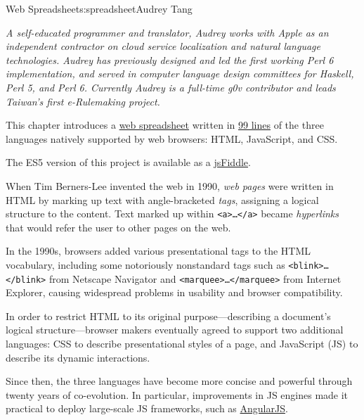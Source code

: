 \begin{aosachapter}{Web Spreadsheet}{s:spreadsheet}{Audrey Tang}

\emph{A self-educated programmer and translator, Audrey works with Apple
as an independent contractor on cloud service localization and natural
language technologies. Audrey has previously designed and led the first
working Perl 6 implementation, and served in computer language design
committees for Haskell, Perl 5, and Perl 6. Currently Audrey is a
full-time g0v contributor and leads Taiwan's first e-Rulemaking
project.}

This chapter introduces a
\href{http://audreyt.github.io/500lines/spreadsheet/}{web spreadsheet}
written in
\href{https://github.com/audreyt/500lines/tree/master/spreadsheet/code}{99
lines} of the three languages natively supported by web browsers: HTML,
JavaScript, and CSS.

The ES5 version of this project is available as a
\href{http://jsfiddle.net/audreyt/LtDyP/}{jsFiddle}.

\label{introduction}

When Tim Berners-Lee invented the web in 1990, \emph{web pages} were
written in HTML by marking up text with angle-bracketed \emph{tags},
assigning a logical structure to the content. Text marked up within
\texttt{\textless{}a\textgreater{}\ldots{}\textless{}/a\textgreater{}}
became \emph{hyperlinks} that would refer the user to other pages on the
web.

In the 1990s, browsers added various presentational tags to the HTML
vocabulary, including some notoriously nonstandard tags such as
\texttt{\textless{}blink\textgreater{}\ldots{}\textless{}/blink\textgreater{}}
from Netscape Navigator and
\texttt{\textless{}marquee\textgreater{}\ldots{}\textless{}/marquee\textgreater{}}
from Internet Explorer, causing widespread problems in usability and
browser compatibility.

In order to restrict HTML to its original purpose---describing a
document's logical structure---browser makers eventually agreed to
support two additional languages: CSS to describe presentational styles
of a page, and JavaScript (JS) to describe its dynamic interactions.

Since then, the three languages have become more concise and powerful
through twenty years of co-evolution. In particular, improvements in JS
engines made it practical to deploy large-scale JS frameworks, such as
\href{http://angularjs.org/}{AngularJS}.


\end{aosachapter}
